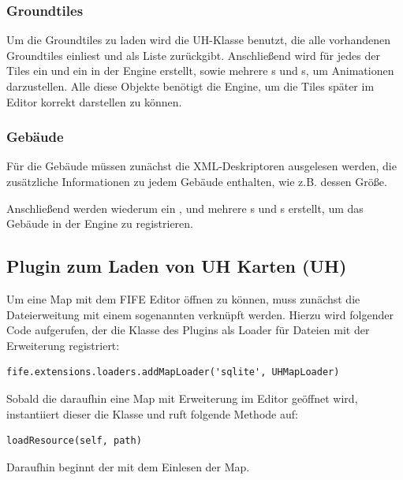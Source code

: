 \subsubsection{Groundtiles}
Um die Groundtiles zu laden wird die UH-Klasse  benutzt,
die alle vorhandenen Groundtiles einliest und als Liste zurückgibt. Anschließend
wird für jedes der Tiles ein  und ein  in der
Engine erstellt, sowie mehrere s und s, um Animationen darzustellen.
Alle diese Objekte benötigt die Engine, um die Tiles später im Editor korrekt
darstellen zu können.

\subsubsection{Gebäude}
Für die Gebäude müssen zunächst die XML-Deskriptoren ausgelesen werden, die
zusätzliche Informationen zu jedem Gebäude enthalten, wie z.B. dessen Größe.

Anschließend werden wiederum ein ,  und
mehrere s und s erstellt, um das Gebäude in
der Engine zu registrieren.


\subsection{Plugin zum Laden von UH Karten (UH)}
\label{sec:registerMapLoader}
Um eine Map mit dem FIFE Editor öffnen zu können, muss zunächst die
Dateierweitung mit einem sogenannten  verknüpft werden.
Hierzu wird folgender Code
aufgerufen, der die Klasse  des  Plugins
als Loader für Dateien mit der Erweiterung  registriert:

\begin{lstlisting}
fife.extensions.loaders.addMapLoader('sqlite', UHMapLoader)
\end{lstlisting}

Sobald die daraufhin eine Map mit  Erweiterung im Editor geöffnet
wird, instantiiert dieser die  Klasse und ruft folgende Methode
auf:

\begin{lstlisting}
loadResource(self, path)
\end{lstlisting}

Daraufhin beginnt der  mit dem Einlesen der Map.

